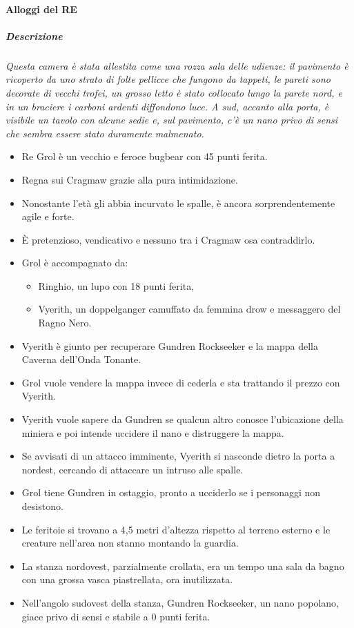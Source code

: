\documentclass{article}
\begin{document}
\paragraph{Alloggi del RE}
    \subparagraph{Descrizione}
            \textit{Questa camera è stata allestita come una rozza sala delle
            udienze: il pavimento è ricoperto da uno strato di folte pellicce
            che fungono da tappeti, le pareti sono decorate di vecchi
            trofei, un grosso letto è stato collocato lungo la parete nord,
            e in un braciere i carboni ardenti diffondono luce. A sud,
            accanto alla porta, è visibile un tavolo con alcune sedie e, sul
            pavimento, c'è un nano privo di sensi che sembra essere stato
            duramente malmenato.}
            \begin{itemize}
                \item Re Grol è un vecchio e feroce bugbear con 45 punti ferita.
                \item Regna sui Cragmaw grazie alla pura intimidazione.
                \item Nonostante l'età gli abbia incurvato le spalle, è ancora sorprendentemente agile e forte.
                \item È pretenzioso, vendicativo e nessuno tra i Cragmaw osa contraddirlo.
                \item Grol è accompagnato da:
                \begin{itemize}
                    \item Ringhio, un lupo con 18 punti ferita,
                    \item Vyerith, un doppelganger camuffato da femmina drow e messaggero del Ragno Nero.
                \end{itemize}
                \item Vyerith è giunto per recuperare Gundren Rockseeker e la mappa della Caverna dell’Onda Tonante.
                \item Grol vuole vendere la mappa invece di cederla e sta trattando il prezzo con Vyerith.
                \item Vyerith vuole sapere da Gundren se qualcun altro conosce l'ubicazione della miniera e poi intende uccidere il nano e distruggere la mappa.
                \item Se avvisati di un attacco imminente, Vyerith si nasconde dietro la porta a nordest, cercando di attaccare un intruso alle spalle.
                \item Grol tiene Gundren in ostaggio, pronto a ucciderlo se i personaggi non desistono.
                \item Le feritoie si trovano a 4,5 metri d'altezza rispetto al terreno esterno e le creature nell'area non stanno montando la guardia.
                \item La stanza nordovest, parzialmente crollata, era un tempo una sala da bagno con una grossa vasca piastrellata, ora inutilizzata.
                \item Nell'angolo sudovest della stanza, Gundren Rockseeker, un nano popolano, giace privo di sensi e stabile a 0 punti ferita.
            \end{itemize}
\end{document}
